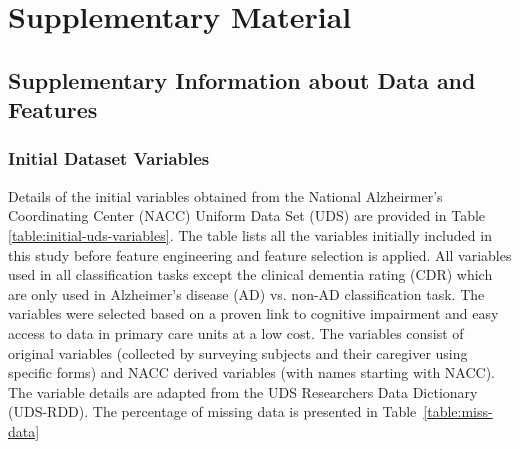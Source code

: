 
\chapter{Supplementary Material}

\hspace{4em}%

\section{Supplementary Information about Data and Features}

\subsection{Initial Dataset Variables}
Details of the initial variables obtained from the National Alzheirmer's Coordinating Center (\acrshort{NACC}) Uniform Data Set (\acrshort{UDS}) are provided in Table \ref{table:initial-uds-variables}. The table lists all the variables initially included in this study before feature engineering and feature selection is applied. All variables used in all classification tasks except the clinical dementia rating (\acrshort{CDR}) which are only used in Alzheimer's disease (\acrshort{AD}) vs. non-AD classification task. The variables were selected based on a proven link to cognitive impairment and easy access to data in primary care units at a low cost. The variables consist of original variables (collected by surveying subjects and their caregiver using specific forms) and NACC derived variables (with names starting with NACC). The variable details are adapted from the UDS Researchers Data Dictionary (UDS-RDD)\footnotemark. The percentage of missing data is presented in Table~\ref{table:miss-data}


